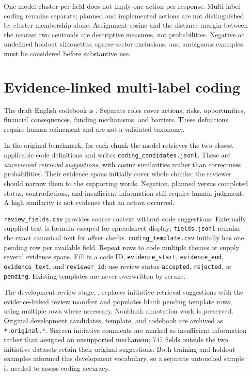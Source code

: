 \documentclass[11pt,a4paper]{article}
\begin{document}
One model cluster per field does not imply one action per response.
Multi-label coding remains separate; planned and implemented actions are
not distinguished by cluster membership alone. Assignment cosine and the
distance margin between the nearest two centroids are descriptive measures,
not probabilities. Negative or undefined holdout silhouettes, sparse-sector
exclusions, and ambiguous examples must be considered before substantive use.

\section{Evidence-linked multi-label coding}
The draft English codebook is
. Separate roles cover actions,
risks, opportunities, financial consequences, funding mechanisms, and
barriers. These definitions require human refinement and are not a
validated taxonomy.

In the original benchmark, for each chunk the model retrieves the two closest applicable code
definitions and writes \texttt{coding\_candidates.jsonl}. These are
\emph{unreviewed retrieval suggestions}, with cosine similarities rather
than correctness probabilities. Their evidence spans initially cover
whole chunks; the reviewer should narrow them to the supporting words.
Negation, planned versus completed status, contradictions, and insufficient
information still require human judgment. A high similarity is not evidence
that an action occurred.

\texttt{review\_fields.csv} provides source context without code suggestions.
Externally supplied text is formula-escaped for spreadsheet display;
\texttt{fields.jsonl} remains the exact canonical text for offset checks.
\texttt{coding\_template.csv} initially has one pending row per available field.
Repeat rows to code multiple themes or supply several evidence spans.
Fill in a code ID, \texttt{evidence\_start}, \texttt{evidence\_end},
\texttt{evidence\_text}, and \texttt{reviewer\_id}; use review status
\texttt{accepted}, \texttt{rejected}, or \texttt{pending}.
Existing templates are never overwritten by reruns.

The development review stage,
, replaces initiative
retrieval suggestions with the evidence-linked review manifest and
populates blank pending template rows, using multiple rows where necessary.
Nonblank annotation work is preserved. Original development candidates,
template, and codebook are archived as \texttt{*.original.*}.
Sixteen initiative comments are marked as insufficient information rather
than assigned an unsupported mechanism; 747 fields outside the two initiative
datasets retain their original suggestions.
Both training and holdout examples informed this development vocabulary,
so a separate untouched sample is needed to assess coding accuracy.
\end{document}
